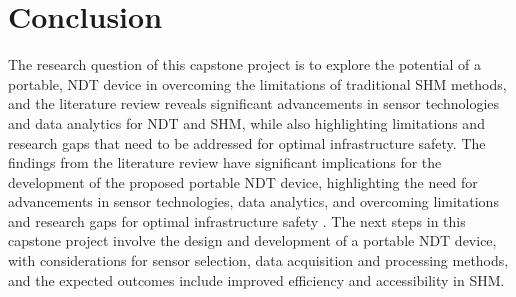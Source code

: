 \documentclass[journal, a4paper]{IEEEtran}
\begin{document}
\section{Conclusion}  %
The research question of this capstone project is to explore the potential of a portable,
NDT device in overcoming the limitations of traditional SHM methods,
and the literature review reveals significant advancements in sensor technologies and data analytics for NDT and SHM,
while also highlighting limitations and research gaps that need to be addressed for optimal infrastructure safety.
The findings from the literature review have significant implications for the development of the
proposed portable NDT device, highlighting the need for advancements in sensor technologies,
data analytics, and overcoming limitations and research gaps for optimal infrastructure safety \cite{Udell2018} \cite{Meier2018}.
The next steps in this capstone project involve the design and development of a portable
NDT device, with considerations for sensor selection, data acquisition and processing methods,
and the expected outcomes include improved efficiency and accessibility in SHM.









\ifCLASSOPTIONcaptionsoff
  \newpage
\fi






\end{document}
